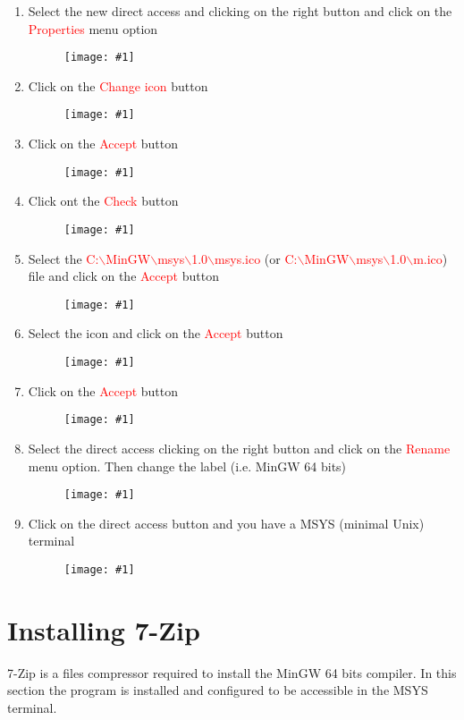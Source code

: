 \documentclass[a4paper]{article}
\newcommand{\FIGURE}[1]
{
	\begin{figure}[!ht]
	\centering
	\texttt{[image: \#1]}
	\end{figure}
}
\newcommand{\RED}[1] {\textcolor{red}{#1}}
\begin{document}
\begin{enumerate}
\clearpage

\item Select the new direct access and clicking on the right button and click on
the \RED{Properties} menu option
\FIGURE{msys-13.png.eps}

\item Click on the \RED{Change icon} button
\FIGURE{msys-14.png.eps}

\clearpage

\item Click on the \RED{Accept} button
\FIGURE{msys-15.png.eps}

\item Click ont the \RED{Check} button
\FIGURE{msys-16.png.eps}

\clearpage

\item Select the
\RED{C:$\backslash$MinGW$\backslash$msys$\backslash$1.0$\backslash$msys.ico} (or
\RED{C:$\backslash$MinGW$\backslash$msys$\backslash$1.0$\backslash$m.ico}) file
and click on the \RED{Accept} button
\FIGURE{msys-17.png.eps}

\item Select the icon and click on the \RED{Accept} button
\FIGURE{msys-18.png.eps}

\clearpage

\item Click on the \RED{Accept} button
\FIGURE{msys-19.png.eps}

\item Select the direct access clicking on the right button and click on the
\RED{Rename} menu option. Then change the label (i.e. MinGW 64 bits)
\FIGURE{msys-20.png.eps}

\clearpage

\item Click on the direct access button and you have a MSYS (minimal Unix)
terminal
\FIGURE{msys-21.png.eps}

\end{enumerate}

\clearpage

\section{Installing 7-Zip}

7-Zip is a files compressor required to install the MinGW 64 bits compiler. In
this section the program is installed and configured to be accessible in the
MSYS terminal.
\end{document}
